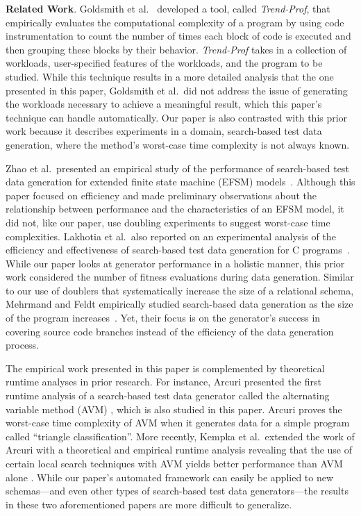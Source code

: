 {\bf Related Work}. Goldsmith et al.~\cite{Goldsmith2007} developed a tool, called \textit{Trend-Prof}, that empirically
evaluates the computational complexity of a program by using code instrumentation to count the number of times each
block of code is executed and then grouping these blocks by their behavior.  \textit{Trend-Prof} takes in a collection
of workloads, user-specified features of the workloads, and the program to be studied. While this technique results in a
more detailed analysis that the one presented in this paper, Goldsmith et al.\ did not address the issue of generating
the workloads necessary to achieve a meaningful result, which this paper's technique can handle automatically.  Our
paper is also contrasted with this prior work because it describes experiments in a domain, search-based test data
generation, where the method's worst-case time complexity is not always known.

Zhao et al.\ presented an empirical study of the performance of search-based test data generation for extended finite
state machine (EFSM) models~\cite{zhao2010}. Although this paper focused on efficiency and made preliminary observations
about the relationship between performance and the characteristics of an EFSM model, it did not, like our paper, use
doubling experiments to suggest worst-case time complexities.  Lakhotia et al.\ also reported on an experimental
analysis of the efficiency and effectiveness of search-based test data generation for C programs~\cite{lakhotia2013}.
While our paper looks at generator performance in a holistic manner, this prior work considered the number of fitness
evaluations during data generation. Similar to our use of doublers that systematically increase the size of a relational
schema, Mehrmand and Feldt empirically studied search-based data generation as the size of the program
increases~\cite{mehrmand2010}. Yet, their focus is on the generator's success in covering source code branches instead
of the efficiency of the data generation process.


The empirical work presented in this paper is complemented by theoretical runtime analyses in prior research.  For
instance, Arcuri presented the first runtime analysis of a search-based test data generator called the alternating
variable method (AVM) \cite{arcuri2009}, which is also studied in this paper. Arcuri proves the worst-case time
complexity of AVM when it generates data for a simple program called ``triangle classification''. More recently, Kempka
et al.\ extended the work of Arcuri with a theoretical and empirical runtime analysis revealing that the use of certain
local search techniques with AVM yields better performance than AVM alone \cite{kempka2015}.  While our paper's
automated framework can easily be applied to new schemas---and even other types of search-based test data
generators---the results in these two aforementioned papers are more difficult to generalize.



